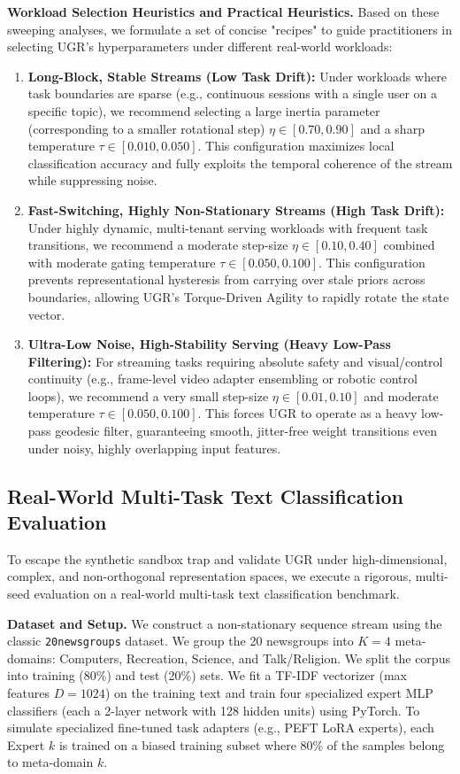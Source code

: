 \textbf{Workload Selection Heuristics and Practical Heuristics.} Based on these sweeping analyses, we formulate a set of concise "recipes" to guide practitioners in selecting UGR's hyperparameters under different real-world workloads:
\begin{enumerate}
    \item \textbf{Long-Block, Stable Streams (Low Task Drift):} Under workloads where task boundaries are sparse (e.g., continuous sessions with a single user on a specific topic), we recommend selecting a large inertia parameter (corresponding to a smaller rotational step) $\eta \in [0.70, 0.90]$ and a sharp temperature $\tau \in [0.010, 0.050]$. This configuration maximizes local classification accuracy and fully exploits the temporal coherence of the stream while suppressing noise.
    \item \textbf{Fast-Switching, Highly Non-Stationary Streams (High Task Drift):} Under highly dynamic, multi-tenant serving workloads with frequent task transitions, we recommend a moderate step-size $\eta \in [0.10, 0.40]$ combined with moderate gating temperature $\tau \in [0.050, 0.100]$. This configuration prevents representational hysteresis from carrying over stale priors across boundaries, allowing UGR's Torque-Driven Agility to rapidly rotate the state vector.
    \item \textbf{Ultra-Low Noise, High-Stability Serving (Heavy Low-Pass Filtering):} For streaming tasks requiring absolute safety and visual/control continuity (e.g., frame-level video adapter ensembling or robotic control loops), we recommend a very small step-size $\eta \in [0.01, 0.10]$ and moderate temperature $\tau \in [0.050, 0.100]$. This forces UGR to operate as a heavy low-pass geodesic filter, guaranteeing smooth, jitter-free weight transitions even under noisy, highly overlapping input features.
\end{enumerate}

\subsection{Real-World Multi-Task Text Classification Evaluation}
\label{subsec:real_world}
To escape the synthetic sandbox trap and validate UGR under high-dimensional, complex, and non-orthogonal representation spaces, we execute a rigorous, multi-seed evaluation on a real-world multi-task text classification benchmark.

\textbf{Dataset and Setup.} We construct a non-stationary sequence stream using the classic \texttt{20newsgroups} dataset. We group the 20 newsgroups into $K=4$ meta-domains: Computers, Recreation, Science, and Talk/Religion. We split the corpus into training (80\%) and test (20\%) sets. We fit a TF-IDF vectorizer (max features $D=1024$) on the training text and train four specialized expert MLP classifiers (each a 2-layer network with 128 hidden units) using PyTorch. To simulate specialized fine-tuned task adapters (e.g., PEFT LoRA experts), each Expert $k$ is trained on a biased training subset where 80\% of the samples belong to meta-domain $k$.

